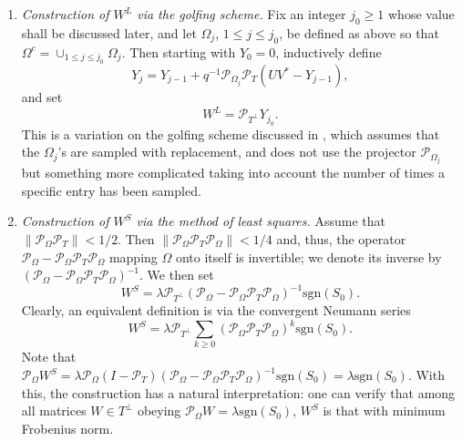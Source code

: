 \begin{enumerate}
\item {\em Construction of $W^L$ via the golfing scheme.}  Fix an integer $j_0 \ge 1$ whose value shall be discussed later, and let
  $\Omega_j$, $1 \le j \le j_0$, be defined as above so that $\Omega^c
  = \cup_{1 \le j \le j_0} \Omega_j$.  Then starting with $Y_0 = 0$, inductively define
\[
Y_j = Y_{j-1} + q^{-1} \mathcal{P}_{\Omega_j} \mathcal{P}_T(UV^* - Y_{j-1}),
\]
and set 
\begin{equation}
  \label{eq:WL}
  W^L = \mathcal{P}_{T^\perp} Y_{j_0}. 
\end{equation}
This is a variation on the golfing scheme discussed in \cite{GrossMC}, which assumes that the $\Omega_j$'s are sampled with replacement, and does not use the projector $\mathcal{P}_{\Omega_j}$ but something more complicated taking into account the number of times a specific entry has been sampled.

\item {\em Construction of $W^S$ via the method of least squares.} Assume that $\|\mathcal{P}_{\Omega}\mathcal{P}_T\| < 1/2$. Then $\|\mathcal{P}_{\Omega} \mathcal{P}_T \mathcal{P}_{\Omega}\| < 1/4$ and, thus, the operator $\mathcal{P}_{\Omega} - \mathcal{P}_{\Omega} \mathcal{P}_T \mathcal{P}_{\Omega}$ mapping $\Omega$ onto itself is invertible; we denote its inverse by $(\mathcal{P}_{\Omega} - \mathcal{P}_{\Omega} \mathcal{P}_T \mathcal{P}_{\Omega})^{-1}$.
  We then set
  \begin{equation}
    \label{eq:WS}
W^S = \lambda \mathcal{P}_{T^\perp} (\mathcal{P}_{\Omega} - \mathcal{P}_{\Omega} \mathcal{P}_T \mathcal{P}_{\Omega})^{-1} \textrm{sgn}(S_0).
\end{equation}
Clearly, an equivalent definition is via the convergent Neumann series 
\begin{equation}
\label{eq:neuman}
W^S = \lambda \mathcal{P}_{T^\perp} \sum_{k \ge 0} (\mathcal{P}_{\Omega} \mathcal{P}_T \mathcal{P}_{\Omega})^k \textrm{sgn}(S_0). 
\end{equation}
Note that $\mathcal{P}_{\Omega} W^S = \lambda \mathcal{P}_{\Omega}(I - \mathcal{P}_T) (\mathcal{P}_{\Omega} - \mathcal{P}_{\Omega} \mathcal{P}_T \mathcal{P}_{\Omega})^{-1}
\textrm{sgn}(S_0) = \lambda \textrm{sgn}(S_0)$.  With this, the construction has a natural interpretation: one can verify that among all matrices $W \in
T^\perp$ obeying $\mathcal{P}_{\Omega} W = \lambda \textrm{sgn}(S_0)$, $W^S$ is that with minimum Frobenius norm.
\end{enumerate}

